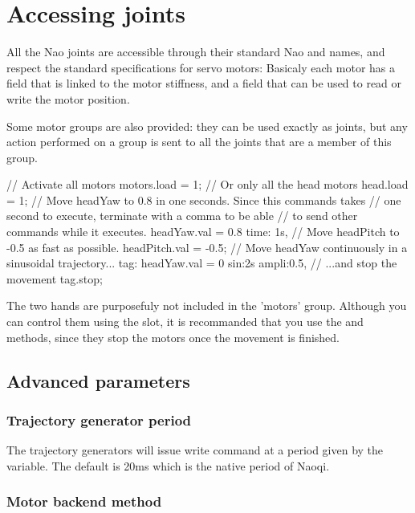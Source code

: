 \section{Accessing joints}
All the Nao joints are accessible through their standard Nao and \urbi names,
and respect the \urbi standard specifications for servo motors: Basicaly each
motor has a  field that is linked to the motor stiffness, and a
 field that can be used to read or write the motor position.

Some motor groups are also provided: they can be used exactly as joints,
but any action performed on a group is sent to all the joints that are a
member of this group.

\begin{urbiunchecked}
// Activate all motors
motors.load = 1;
// Or only all the head motors
head.load = 1;
// Move headYaw to 0.8 in one seconds. Since this commands takes
// one second to execute, terminate with a comma to be able
// to send other commands while it executes.
headYaw.val = 0.8 time: 1s,
// Move headPitch to -0.5 as fast as possible.
headPitch.val = -0.5;
// Move headYaw continuously in a sinusoidal trajectory...
tag: headYaw.val = 0 sin:2s ampli:0.5,
// ...and stop the movement
tag.stop;
\end{urbiunchecked}

The two hands are purposefuly not included in the 'motors' group.
Although you can control them using the  slot, it is recommanded that
you use the  and  methods, since they stop the motors
once the movement is finished.

\subsection{Advanced parameters}

\subsubsection{Trajectory generator period}

The trajectory generators will issue write command at a period given by the
 variable. The default is 20ms which is the native period
of Naoqi.

\subsubsection{Motor backend method}

